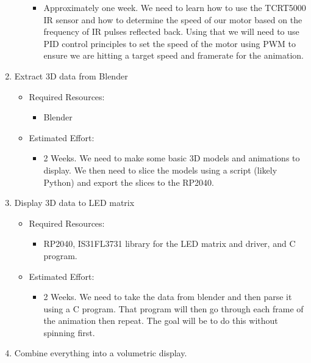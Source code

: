 \documentclass[11pt,journal]{IEEEtran}
\begin{document}
\begin{enumerate}
\begin{itemize}
        \begin{itemize}
            \item Approximately one week. We need to learn how to use the TCRT5000 IR sensor and how to determine the speed of our motor based on the frequency of IR pulses reflected back. Using that we will need to use PID control principles to set the speed of the motor using PWM to ensure we are hitting a target speed and framerate for the animation.
        \end{itemize}
    \end{itemize}
    \item Extract 3D data from Blender
    \begin{itemize}
        \item Required Resources:
        \begin{itemize}
            \item Blender
        \end{itemize}
        \item Estimated Effort:
        \begin{itemize}
            \item 2 Weeks. We need to make some basic 3D models and animations to display. We then need to slice the models using a script (likely Python) and export the slices to the RP2040.
        \end{itemize}
    \end{itemize}
    \item Display 3D data to LED matrix
    \begin{itemize}
        \item Required Resources:
        \begin{itemize}
            \item RP2040, IS31FL3731 library for the LED matrix and driver, and C program.
        \end{itemize}
        \item Estimated Effort:
        \begin{itemize}
            \item 2 Weeks. We need to take the data from blender and then parse it using a C program. That  program will then go through each frame of the animation then repeat. The goal will be to do this without spinning first.
        \end{itemize}
    \end{itemize}
    \item Combine everything into a volumetric display.
    \begin{itemize}

\end{itemize}
\end{enumerate}
\end{document}
